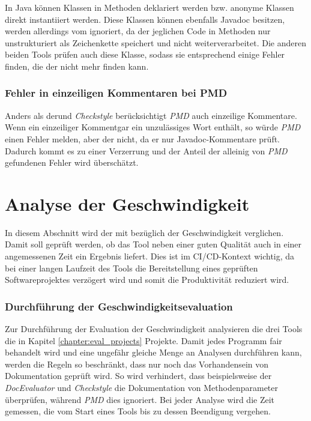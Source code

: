 In Java können Klassen in Methoden deklariert werden bzw. anonyme Klassen direkt instantiiert werden. Diese Klassen können ebenfalls Javadoc besitzen, werden allerdings vom \doceval ignoriert, da der \doceval jeglichen Code in Methoden nur unstrukturiert als Zeichenkette speichert und nicht weiterverarbeitet. Die anderen beiden Tools prüfen auch diese Klasse, sodass sie entsprechend einige Fehler finden, die der \doceval nicht mehr finden kann. 


\subsubsection{Fehler in einzeiligen Kommentaren bei PMD}
Anders als der\doceval und \textit{Checkstyle} berücksichtigt \textit{PMD} auch einzeilige Kommentare. Wenn ein einzeiliger Kommentgar ein unzulässiges Wort enthält, so würde \textit{PMD} einen Fehler melden, aber der \doceval nicht, da er nur Javadoc-Kommentare prüft. Dadurch kommt es zu einer Verzerrung und der Anteil der alleinig von \textit{PMD} gefundenen Fehler wird überschätzt.  


\clearpage

 \section{Analyse der Geschwindigkeit} \label{chapter:speed}
 In diesem Abschnitt wird der \doceval mit \checkpmd bezüglich der Geschwindigkeit verglichen. Damit soll geprüft werden, ob das Tool neben einer guten Qualität auch in einer angemessenen Zeit ein Ergebnis liefert. Dies ist im \ac{CI/CD}-Kontext wichtig, da bei einer langen Laufzeit des Tools  die Bereitstellung eines geprüften Softwareprojektes verzögert wird und somit die Produktivität reduziert wird. 
 
 \subsubsection{Durchführung der Geschwindigkeitsevaluation}
 Zur Durchführung der Evaluation der Geschwindigkeit analysieren die drei Tools die in Kapitel \ref{chapter:eval_projects} Projekte. Damit jedes Programm fair behandelt wird und eine ungefähr gleiche Menge an Analysen durchführen kann, werden die Regeln so beschränkt, dass nur noch das Vorhandensein von Dokumentation geprüft wird. So wird verhindert, dass beispielsweise der \textit{DocEvaluator} und \textit{Checkstyle} die Dokumentation von Methodenparameter überprüfen, während \textit{PMD} dies ignoriert. Bei jeder Analyse wird die Zeit gemessen, die vom Start eines Tools bis zu dessen Beendigung vergehen. 
 
